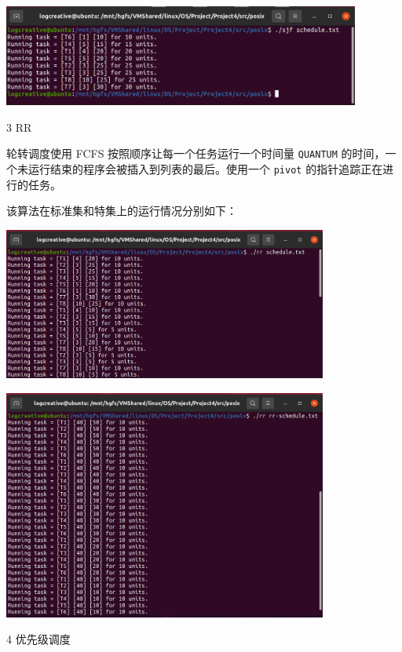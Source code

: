 \documentclass[12pt,a4paper]{article}
\newenvironment{problems}{\begin{list}{}{\renewcommand{\makelabel}[1]{\textbf{##1}\hfil}}}{\end{list}}
\newenvironment{steps}{\begin{list}{}{\renewcommand{\makelabel}[1]{##1.\hfil}}}{\end{list}}
\begin{document}
\begin{problems}
\begin{steps}
        \includegraphics[width=0.88\textwidth]{sjf.png}

        \item[3] RR
        
        

        轮转调度使用 FCFS 按照顺序让每一个任务运行一个时间量 \verb"QUANTUM" 的时间，一个未运行结束的程序会被插入到列表的最后。使用一个 \verb"pivot" 的指针追踪正在进行的任务。

        该算法在标准集和特集上的运行情况分别如下：

        \includegraphics[width=0.8\textwidth]{rr1.png}

        \includegraphics[width=0.8\textwidth]{rr2.png}

        \item[4] 优先级调度
        

\end{steps}
\end{problems}
\end{document}

